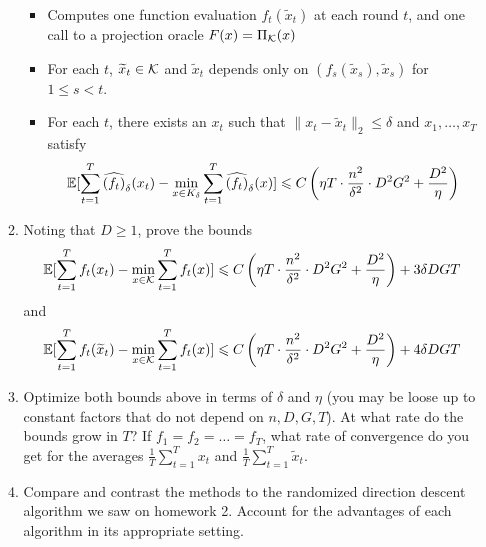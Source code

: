 \documentclass[12pt]{article}
\begin{document}
\begin{enumerate}
\begin{enumerate}
			\begin{itemize}
			\item Computes one function evaluation $f_t(\widetilde{x}_t)$ at each round $t$, and one call to a projection oracle $F(x) = \Pi_{{\cal K}}(x)$
			\item For each $t$, $\widetilde{x}_t \in {\cal K}$ and $\widetilde{x}_t$ depends only on $(f_s(\widetilde{x}_s), \widetilde{x}_s )$ for $1 \le s < t$.
			\item For each $t$, there exists an $x_t$ such that $\|x_t - \widetilde{x}_t\|_2 \le \delta$ and $x_1,\dots,x_T$ satisfy 
			\begin{eqnarray}
		\mathbb{E}[\sum_{t=1}^T \widehat{(f_t)}_{\delta}(x_t) - \min_{x \in K_{\delta}} \sum_{t=1}^T \widehat{(f_t)}_{\delta}(x)] \leqslant C\left(\eta T \cdot \frac{n^2}{\delta^2} \cdot D^2 G^2 + \frac{D^2}{\eta}\right)
		\end{eqnarray}
		\end{itemize} 
		\item Noting that $D \ge 1$, prove the bounds
		\begin{eqnarray}
		\mathbb{E}[\sum_{t=1}^T f_{t}(x_t) - \min_{x \in {\cal K}} \sum_{t=1}^T f_t(x)] \leqslant C\left(\eta T \cdot \frac{n^2}{\delta^2} \cdot D^2 G^2 + \frac{D^2}{\eta}\right) + 3 \delta DGT
		\end{eqnarray}
		and 
		\begin{eqnarray}
		\mathbb{E}[\sum_{t=1}^T f_{t}(\widetilde{x}_t) - \min_{x \in {\cal K}} \sum_{t=1}^T f_t(x)] \leqslant C\left(\eta T \cdot \frac{n^2}{\delta^2} \cdot D^2 G^2 + \frac{D^2}{\eta}\right) + 4 \delta DGT
		\end{eqnarray}
		\item Optimize both bounds above in terms of $\delta$ and $\eta$ (you may be loose up to constant factors that do not depend on $n, D,G, T$). At what rate do the bounds grow in $T$? If $f_1 = f_2 = \dots = f_T$, what rate of convergence do you get for the averages $\frac{1}{T}\sum_{t=1}^Tx_t$ and $\frac{1}{T}\sum_{t=1}^T\widetilde{x}_t$.
		\item Compare and contrast the methods to the randomized direction descent algorithm we saw on homework 2. Account for the advantages of each algorithm in its appropriate setting. 
		\end{enumerate}
	\end{enumerate}
\end{document}
